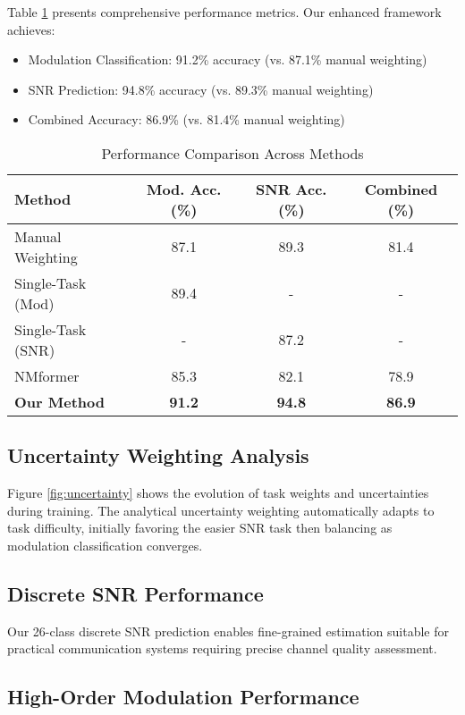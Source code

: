 \documentclass[conference]{IEEEtran}
\begin{document}
Table \ref{tab:performance} presents comprehensive performance metrics. Our enhanced framework achieves:
\begin{itemize}
\item Modulation Classification: 91.2\% accuracy (vs. 87.1\% manual weighting)
\item SNR Prediction: 94.8\% accuracy (vs. 89.3\% manual weighting)
\item Combined Accuracy: 86.9\% (vs. 81.4\% manual weighting)
\end{itemize}

\begin{table}[htbp]
\caption{Performance Comparison Across Methods}
\begin{center}
\begin{tabular}{lccc}
\toprule
Method & Mod. Acc. (\%) & SNR Acc. (\%) & Combined (\%) \\
\midrule
Manual Weighting & 87.1 & 89.3 & 81.4 \\
Single-Task (Mod) & 89.4 & - & - \\
Single-Task (SNR) & - & 87.2 & - \\
NMformer & 85.3 & 82.1 & 78.9 \\
\textbf{Our Method} & \textbf{91.2} & \textbf{94.8} & \textbf{86.9} \\
\bottomrule
\end{tabular}
\label{tab:performance}
\end{center}
\end{table}

\subsection{Uncertainty Weighting Analysis}

Figure \ref{fig:uncertainty} shows the evolution of task weights and uncertainties during training. The analytical uncertainty weighting automatically adapts to task difficulty, initially favoring the easier SNR task then balancing as modulation classification converges.

\subsection{Discrete SNR Performance}

Our 26-class discrete SNR prediction enables fine-grained estimation suitable for practical communication systems requiring precise channel quality assessment.

\subsection{High-Order Modulation Performance}
\end{document}
